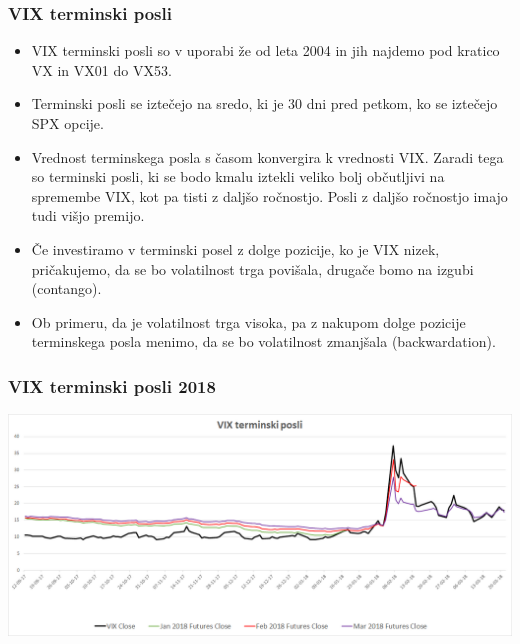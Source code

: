 \documentclass[10pt]{beamer}
\begin{document}
\begin{frame}
\frametitle{VIX terminski posli}
\begin{itemize}
\item VIX terminski posli so v uporabi že od leta 2004 in jih najdemo pod kratico VX in VX01 do VX53.
\item Terminski posli se iztečejo na sredo, ki je 30 dni pred petkom, ko se iztečejo SPX opcije.
\item Vrednost terminskega posla s časom konvergira k vrednosti VIX. Zaradi tega so terminski posli, ki se bodo kmalu iztekli veliko bolj občutljivi na spremembe VIX, kot pa tisti z daljšo ročnostjo. Posli z daljšo ročnostjo imajo tudi višjo premijo.
\item Če investiramo v terminski posel z dolge pozicije, ko je VIX nizek, pričakujemo, da se bo volatilnost trga povišala, drugače bomo na izgubi (contango). 
\item Ob primeru, da je volatilnost trga visoka, pa z nakupom dolge pozicije terminskega posla menimo, da se bo volatilnost zmanjšala (backwardation). 
\end{itemize}
\end{frame}

\begin{frame}
\frametitle{VIX terminski posli 2018}
\includegraphics[width=1\textwidth]{./Grafi/VIX futures 2018.png}
\end{frame}
\end{document}
